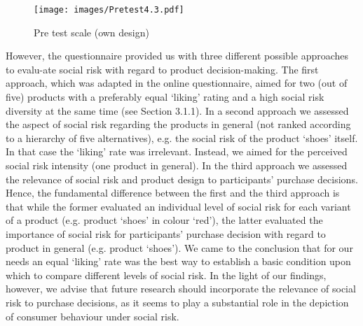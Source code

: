 \begin{figure}[H]
		\texttt{[image: images/Pretest4.3.pdf]}
		\caption{Pre test scale (own design)}\label{fig:pretest_scale}
\end{figure}
However, the questionnaire provided us with three different possible approaches to evalu-ate social risk with regard to product decision-making. The first approach, which was adapted in the online questionnaire, aimed for two (out of five) products with a preferably equal ‘liking’ rating and a high social risk diversity at the same time (see Section 3.1.1). In a second approach we assessed the aspect of social risk regarding the products in general (not ranked according to a hierarchy of five alternatives), e.g. the social risk of the product ‘shoes’ itself. In that case the ‘liking’ rate was irrelevant. Instead, we aimed for the perceived social risk intensity (one product in general). In the third approach we assessed the relevance of social risk and product design to participants’ purchase decisions. Hence, the fundamental difference between the first and the third approach is that while the former evaluated an individual level of social risk for each variant of a product (e.g. product ‘shoes’ in colour ‘red’), the latter evaluated the importance of social risk for participants’ purchase decision with regard to product in general (e.g. product ‘shoes’). We came to the conclusion that for our needs an equal ‘liking’ rate was the best way to establish a basic condition upon which to compare different levels of social risk. In the light of our findings, however, we advise that future research should incorporate the relevance of social risk to purchase decisions, as it seems to play a substantial role in the depiction of consumer behaviour under social risk.\par
